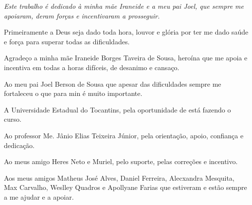 
\imprimircapa

\imprimirfolhaderosto


%
% 

\begin{dedicatoria}
   \vspace*{\fill}
   \centering
   \noindent
   \textit{ Este trabalho é dedicado à minha mãe Iraneide e a meu pai Joel, que sempre me apoiaram, deram forças e incentivaram a prosseguir. } \vspace*{\fill}
\end{dedicatoria}

\begin{agradecimentos}
Primeiramente a Deus seja dado toda hora, louvor e glória por ter me dado saúde e força para superar todas as dificuldades.

Agradeço a minha mãe Iraneide Borges Taveira de Sousa, heroína que me apoia e incentiva em todas a horas difíceis, de desanimo e cansaço.

Ao meu pai Joel Berson de Sousa que apesar das dificuldades sempre me fortaleceu o que para min é muito importante.

A Universidade Estadual do Tocantins, pela oportunidade de está fazendo o curso.

Ao professor Me. Jânio Elias Teixeira Júnior, pela orientação, apoio, confiança e dedicação.

Ao meus amigo Heres Neto e Muriel, pelo suporte, pelas correções e incentivo.

Aos meus amigos Matheus José Alves, Daniel Ferreira, Alecxandra Mesquita, Max Carvalho, Weslley Quadros e Apollyane Farias que estiveram e estão sempre a me ajudar e a apoiar.
\end{agradecimentos}

